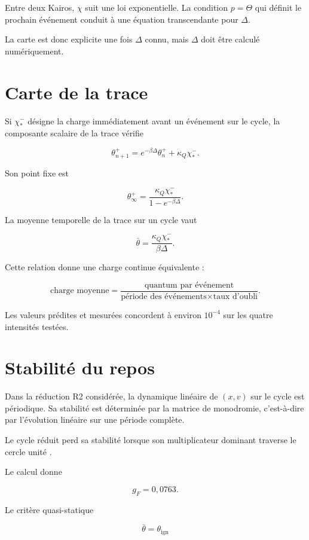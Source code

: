Entre deux Kairos, \(\chi\) suit une loi exponentielle. La condition
\(p=\Theta\) qui définit le prochain événement conduit à une équation
transcendante pour \(\Delta\).

La carte est donc explicite une fois \(\Delta\) connu, mais \(\Delta\)
doit être calculé numériquement.

\section{Carte de la trace}\label{t2-carte-de-la-trace}

Si \(\chi_\ast^-\) désigne la charge immédiatement avant un événement sur le cycle, la composante scalaire de la trace vérifie

\[
\theta_{n+1}^+
=
e^{-\beta\Delta}\theta_n^+
+
\kappa_Q\chi_\ast^-.
\]

Son point fixe est

\[
\boxed{
\theta_\infty^+
=
\frac{\kappa_Q\chi_\ast^-}
{1-e^{-\beta\Delta}}
}.
\]

La moyenne temporelle de la trace sur un cycle vaut

\[
\boxed{
\bar\theta
=
\frac{\kappa_Q\chi_\ast^-}
{\beta\Delta}
}.
\]

Cette relation donne une charge continue équivalente :

\[
\text{charge moyenne}
=
\frac{\text{quantum par événement}}
{\text{période des événements}\times\text{taux d'oubli}}.
\]

Les valeurs prédites et mesurées concordent à environ \(10^{-4}\) sur
les quatre intensités testées.

\section{Stabilité du repos}\label{t2-stabilite-du-repos}

Dans la réduction R2 considérée, la dynamique linéaire de \((x,v)\) sur le cycle est périodique. Sa stabilité est déterminée par la matrice de monodromie, c'est-à-dire par l'évolution linéaire sur une période complète.

Le cycle réduit perd sa stabilité lorsque son multiplicateur dominant traverse le cercle unité \citep{goebel2012hybrid, lakshmikantham1989impulsive}.

Le calcul donne

\[
g_F=0{,}0763.
\]

Le critère quasi-statique

\[
\bar\theta=\theta_{\mathrm{ign}}
\]

